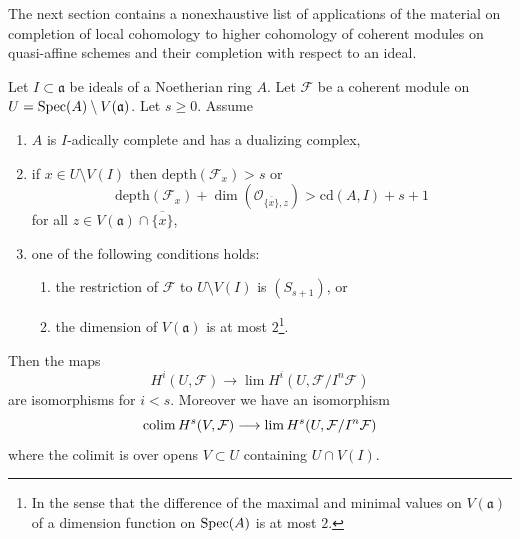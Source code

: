\noindent
The next section contains a nonexhaustive list of
applications of the material
on completion of local cohomology to higher cohomology
of coherent modules on quasi-affine schemes and their
completion with respect to an ideal.

\begin{proposition}
\label{proposition-application-higher}
Let $I \subset \mathfrak a$ be ideals of a Noetherian ring $A$.
Let $\mathcal{F}$ be a coherent module on
$U = \mathop{\mathrm{Spec}}(A) \setminus V(\mathfrak a)$.
Let $s \geq 0$.
Assume
\begin{enumerate}
\item $A$ is $I$-adically complete and has a dualizing complex,
\item if $x \in U \setminus V(I)$ then
$\text{depth}(\mathcal{F}_x) > s$ or
$$
\text{depth}(\mathcal{F}_x) +
\dim(\mathcal{O}_{\overline{\{x\}}, z}) > \text{cd}(A, I) + s + 1
$$
for all $z \in V(\mathfrak a) \cap \overline{\{x\}}$,
\item one of the following conditions holds:
\begin{enumerate}
\item the restriction of $\mathcal{F}$ to $U \setminus V(I)$
is $(S_{s + 1})$, or
\item the dimension of $V(\mathfrak a)$ is at most $2$\footnote{In
the sense that the difference of the maximal and minimal values
on $V(\mathfrak a)$ of a dimension function on $\mathop{\mathrm{Spec}}(A)$ is at most $2$.}.
\end{enumerate}
\end{enumerate}
Then the maps
$$
H^i(U, \mathcal{F})
\longrightarrow
\lim H^i(U, \mathcal{F}/I^n\mathcal{F})
$$
are isomorphisms for $i < s$. Moreover we have an isomorphism
$$
\mathop{\mathrm{colim}}\nolimits H^s(V, \mathcal{F})
\longrightarrow
\mathop{\mathrm{lim}}\nolimits H^s(U, \mathcal{F}/I^n\mathcal{F})
$$
where the colimit is over opens $V \subset U$ containing $U \cap V(I)$.
\end{proposition}

